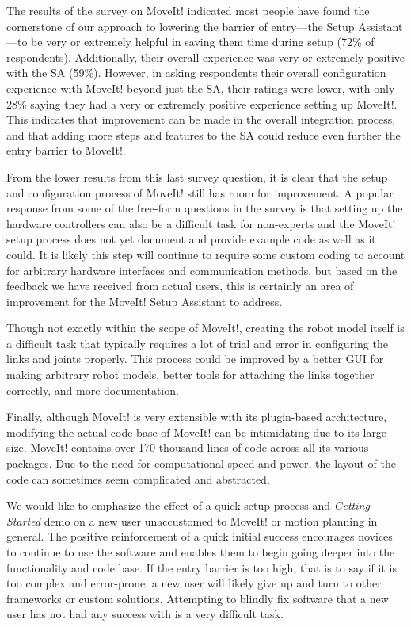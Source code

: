 \documentclass[10pt,journal,compsoc]{joser1}
\begin{document}
{The results of the survey on MoveIt! indicated most people have found the cornerstone of our approach to lowering the barrier of entry---the Setup Assistant---to be very or extremely helpful in saving them time during setup (72\% of respondents). Additionally, their overall experience was very or extremely positive with the SA (59\%). However, in asking respondents their overall configuration experience with MoveIt! beyond just the SA, their ratings were lower, with only 28\% saying they had a very or extremely positive experience setting up MoveIt!. This indicates that improvement can be made in the overall integration process, and that adding more steps and features to the SA could reduce even further the entry barrier to MoveIt!. 

From the lower results from this last survey question, it is clear that the setup and configuration process of MoveIt! still has room for improvement. A popular response from some of the free-form questions in the survey is that setting up the hardware controllers can also be a difficult task for non-experts and the MoveIt! setup process does not yet document and provide example code as well as it could. It is likely this step will continue to require some custom coding to account for arbitrary hardware interfaces and communication methods, but based on the feedback we have received from actual users, this is certainly an area of improvement for the MoveIt! Setup Assistant to address. 

Though not exactly within the scope of MoveIt!, creating the robot model itself is a difficult task that typically requires a lot of trial and error in configuring the links and joints properly. This process could be improved by a better GUI for making arbitrary robot models, better tools for attaching the links together correctly, and more documentation.

Finally, although MoveIt! is very extensible with its plugin-based architecture, modifying the actual code base of MoveIt! can be intimidating due to its large size. MoveIt! contains over 170 thousand lines of code across all its various packages. Due to the need for computational speed and power, the layout of the code can sometimes seem complicated and abstracted. 

We would like to emphasize the effect of a quick setup process and \textit{Getting Started} demo on a new user unaccustomed to MoveIt! or motion planning in general. The positive reinforcement of a quick initial success encourages novices to continue to use the software and enables them to begin going deeper into the functionality and code base. If the entry barrier is too high, that is to say if it is too complex and error-prone, a new user will likely give up and turn to other frameworks or custom solutions. Attempting to blindly fix software that a new user has not had any success with is a very difficult task.

}
\end{document}
